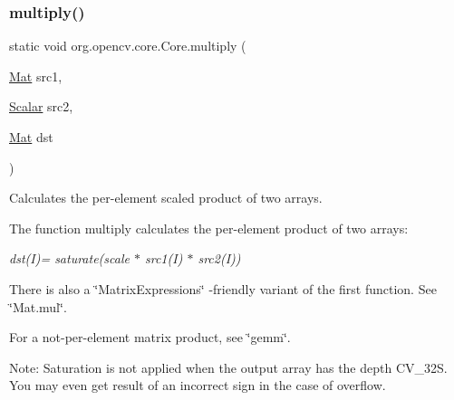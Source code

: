 \subsubsection{\texorpdfstring{multiply()}{multiply()}\hspace{0.1cm}{\footnotesize\ttfamily [6/6]}}
{\footnotesize\ttfamily static void org.\+opencv.\+core.\+Core.\+multiply (\begin{DoxyParamCaption}\item[{\mbox{\hyperlink{classorg_1_1opencv_1_1core_1_1_mat}{Mat}}}]{src1,  }\item[{\mbox{\hyperlink{classorg_1_1opencv_1_1core_1_1_scalar}{Scalar}}}]{src2,  }\item[{\mbox{\hyperlink{classorg_1_1opencv_1_1core_1_1_mat}{Mat}}}]{dst }\end{DoxyParamCaption})\hspace{0.3cm}{\ttfamily [static]}}

Calculates the per-\/element scaled product of two arrays.

The function {\ttfamily multiply} calculates the per-\/element product of two arrays\+:

{\itshape dst(\+I)= saturate(scale $\ast$ src1(\+I) $\ast$ src2(\+I))}

There is also a \char`\"{}\+Matrix\+Expressions\char`\"{} -\/friendly variant of the first function. See \char`\"{}\+Mat.\+mul\char`\"{}.

For a not-\/per-\/element matrix product, see \char`\"{}gemm\char`\"{}.

Note\+: Saturation is not applied when the output array has the depth {\ttfamily C\+V\+\_\+32S}. You may even get result of an incorrect sign in the case of overflow.


